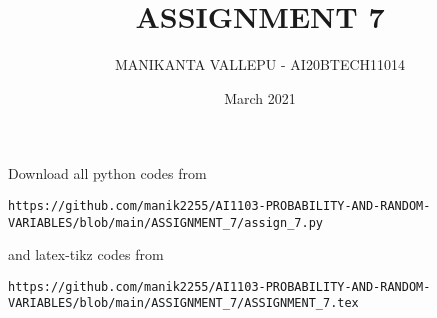 \documentclass[journal,12pt,twocolumn]{IEEEtran}
\date{March 2021}
\DeclareMathOperator*{\Res}{Res}
\begin{document}
\newcommand{\BEQA}{\begin{eqnarray}}
\newcommand{\EEQA}{\end{eqnarray}}
\newcommand{\define}{\stackrel{\triangle}{=}}

\raggedbottom
\setlength{\parindent}{0pt}
\providecommand{\mbf}{\mathbf}
\providecommand{\pr}[1]{\ensuremath{\Pr\left(#1\right)}}
\providecommand{\qfunc}[1]{\ensuremath{Q\left(#1\right)}}
\providecommand{\fn}[1]{\ensuremath{f\left(#1\right)}}
\providecommand{\e}[1]{\ensuremath{E\left(#1\right)}}
\providecommand{\sbrak}[1]{\ensuremath{{}\left[#1\right]}}
\providecommand{\lsbrak}[1]{\ensuremath{{}\left[#1\right.}}
\providecommand{\rsbrak}[1]{\ensuremath{{}\left.#1\right]}}
\providecommand{\brak}[1]{\ensuremath{\left(#1\right)}}
\providecommand{\lbrak}[1]{\ensuremath{\left(#1\right.}}
\providecommand{\rbrak}[1]{\ensuremath{\left.#1\right)}}
\providecommand{\cbrak}[1]{\ensuremath{\left\{#1\right\}}}
\providecommand{\lcbrak}[1]{\ensuremath{\left\{#1\right.}}
\providecommand{\rcbrak}[1]{\ensuremath{\left.#1\right\}}}
\theoremstyle{remark}
\newtheorem{rem}{Remark}
\newcommand{\sgn}{\mathop{\mathrm{sgn}}}
\providecommand{\abs}[1]{\vert#1\vert}
\providecommand{\res}[1]{\Res\displaylimits_{#1}} 
\providecommand{\norm}[1]{\lVert#1\rVert}
\providecommand{\mtx}[1]{\mathbf{#1}}
\providecommand{\mean}[1]{E[ #1 ]}
\providecommand{\fourier}{\overset{\mathcal{F}}{ \rightleftharpoons}}
\providecommand{\system}{\overset{\mathcal{H}}{ \longleftrightarrow}}
\newcommand{\solution}{\noindent \textbf{Solution: }}
\newcommand{\cosec}{\,\text{cosec}\,}
\providecommand{\dec}[2]{\ensuremath{\overset{#1}{\underset{#2}{\gtrless}}}}
\newcommand{\myvec}[1]{\ensuremath{\begin{pmatrix}#1\end{pmatrix}}}
\newcommand{\mydet}[1]{\ensuremath{\begin{vmatrix}#1\end{vmatrix}}}
\makeatletter
\vspace{3cm}
\title{ASSIGNMENT 7}
\author{MANIKANTA VALLEPU - AI20BTECH11014}
\maketitle
\newpage
\bigskip
\renewcommand{\thetable}{\theenumi}
Download all python codes from 
\begin{lstlisting}
https://github.com/manik2255/AI1103-PROBABILITY-AND-RANDOM-VARIABLES/blob/main/ASSIGNMENT_7/assign_7.py
\end{lstlisting}
%
and latex-tikz codes from 
%
\begin{lstlisting}
https://github.com/manik2255/AI1103-PROBABILITY-AND-RANDOM-VARIABLES/blob/main/ASSIGNMENT_7/ASSIGNMENT_7.tex
\end{lstlisting}
\end{document}
